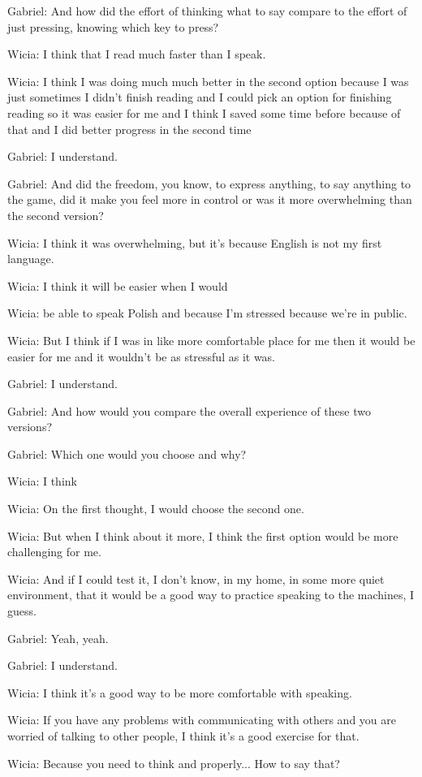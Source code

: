 Gabriel: And how did the effort of thinking what to say compare to the effort of just pressing, knowing which key to press?

Wicia: I think that I read much faster than I speak.

Wicia: I think I was doing much much better in the second option because I was just sometimes I didn't finish reading and I could pick an option for finishing reading so it was easier for me and I think I saved some time before because of that and I did better progress in the second time

Gabriel: I understand.

Gabriel: And did the freedom, you know, to express anything, to say anything to the game, did it make you feel more in control or was it more overwhelming than the second version?

Wicia: I think it was overwhelming, but it's because English is not my first language.

Wicia: I think it will be easier when I would

Wicia: be able to speak Polish and because I'm stressed because we're in public.

Wicia: But I think if I was in like more comfortable place for me then it would be easier for me and it wouldn't be as stressful as it was.

Gabriel: I understand.

Gabriel: And how would you compare the overall experience of these two versions?

Gabriel: Which one would you choose and why?

Wicia: I think

Wicia: On the first thought, I would choose the second one.

Wicia: But when I think about it more, I think the first option would be more challenging for me.

Wicia: And if I could test it, I don't know, in my home, in some more quiet environment, that it would be a good way to practice speaking to the machines, I guess.

Gabriel: Yeah, yeah.

Gabriel: I understand.

Wicia: I think it's a good way to be more comfortable with speaking.

Wicia: If you have any problems with communicating with others and you are worried of talking to other people, I think it's a good exercise for that.

Wicia: Because you need to think and properly... How to say that?

